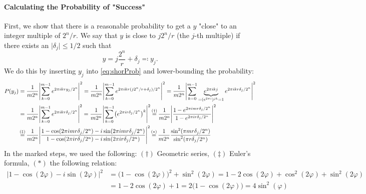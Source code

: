 				\paragraph{Calculating the Probability of "Success"}
					First, we show that there is a reasonable probability to get a \(y\) "close" to an integer multiple of \(2^n/r\). We say that \(y\) is close to \( j 2^n/r \) (the \(j\)-th multiple) if there exists an \( \lvert \delta_j \rvert \leq 1/2 \) such that
					\begin{equation}
						y = j \frac{2^n}{r} + \delta_j \eqqcolon y_j.
					\end{equation}
					We do this by inserting \(y_j\) into \eqref{eq:shorProb} and lower-bounding the probability:
					\begin{align}
						P(y_j)
							&= \frac{1}{m 2^n} \Biggl\lvert \sum_{k = 0}^{m - 1} e^{2 \pi i k r y_j / 2^n} \Biggr\rvert^2
							 = \frac{1}{m 2^n} \Biggl\lvert \sum_{k = 0}^{m - 1} e^{2 \pi i k r (j 2^n/r + \delta_j) / 2^n} \Biggr\rvert^2
							 = \frac{1}{m 2^n} \Biggl\lvert \sum_{k = 0}^{m - 1} \underbrace{e^{2 \pi i k j}}_{= (e^{2 \pi i})^{jk} = 1} e^{2 \pi i k r \delta_j / 2^n} \Biggr\rvert^2 \\
							&= \frac{1}{m 2^n} \Biggl\lvert \sum_{k = 0}^{m - 1} e^{2 \pi i k r \delta_j / 2^n} \Biggr\rvert^2
							 = \frac{1}{m 2^n} \Biggl\lvert \sum_{k = 0}^{m - 1} \bigl( e^{2 \pi i r \delta_j / 2^n} \bigr)^k \Biggr\rvert^2
							 \overset{\mathclap{(\dagger)}}{=} \frac{1}{m 2^n} \Biggl\lvert \frac{1 - e^{2 \pi i m r \delta_j / 2^n}}{1 - e^{2 \pi i r \delta_j / 2^n}} \Biggr\rvert^2 \\
							&\overset{\mathclap{(\ddagger)}}{=} \frac{1}{m 2^n} \Biggl\lvert \frac{1 - \cos(2 \pi i m r \delta_j / 2^n) - i \sin(2 \pi i m r \delta_j / 2^n)}{1 - \cos(2 \pi i r \delta_j / 2^n) - i \sin(2 \pi i r \delta_j / 2^n)} \Biggr\rvert^2
							 \overset{\mathclap{(\ast)}}{=} \frac{1}{m 2^n} \frac{\sin^2(\pi m r \delta_j / 2^n)}{\sin^2(\pi r \delta_j / 2^n)}
					\end{align}
					In the marked steps, we used the following: \((\dagger)\) Geometric series, \((\ddagger)\) Euler's formula, \((\ast)\) the following relation:
					\begin{align}
						\bigl\lvert 1 - \cos(2 \varphi) - i \sin(2 \varphi) \bigr\rvert^2
							&= \bigl( 1 - \cos(2 \varphi) \bigr)^2 + \sin^2(2 \varphi)
							 = 1 - 2 \cos(2 \varphi) + \cos^2(2 \varphi) + \sin^2(2 \varphi) \\
							&= 1 - 2 \cos(2 \varphi) + 1
							 = 2 \bigl( 1 - \cos(2 \varphi) \bigr)
							 = 4 \sin^2(\varphi)
					\end{align}
